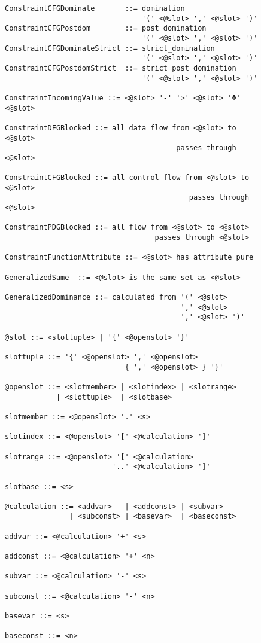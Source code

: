 \begin{figure}[p]
\begin{lstlisting}[language=BNF,basicstyle=\linespread{0.85}\small\ttfamily,
                   firstnumber=101]
ConstraintCFGDominate       ::= domination            
                                '(' <@slot> ',' <@slot> ')'
ConstraintCFGPostdom        ::= post_domination
                                '(' <@slot> ',' <@slot> ')'
ConstraintCFGDominateStrict ::= strict_domination
                                '(' <@slot> ',' <@slot> ')'
ConstraintCFGPostdomStrict  ::= strict_post_domination
                                '(' <@slot> ',' <@slot> ')'

ConstraintIncomingValue ::= <@slot> '-' '>' <@slot> 'Φ' <@slot>

ConstraintDFGBlocked ::= all data flow from <@slot> to <@slot>
                                        passes through <@slot>

ConstraintCFGBlocked ::= all control flow from <@slot> to <@slot>
                                           passes through <@slot>

ConstraintPDGBlocked ::= all flow from <@slot> to <@slot>
                                   passes through <@slot>

ConstraintFunctionAttribute ::= <@slot> has attribute pure

GeneralizedSame  ::= <@slot> is the same set as <@slot>

GeneralizedDominance ::= calculated_from '(' <@slot>
                                         ',' <@slot>
                                         ',' <@slot> ')'

@slot ::= <slottuple> | '{' <@openslot> '}'

slottuple ::= '{' <@openslot> ',' <@openslot>
                            { ',' <@openslot> } '}'

@openslot ::= <slotmember> | <slotindex> | <slotrange>
            | <slottuple>  | <slotbase>

slotmember ::= <@openslot> '.' <s>

slotindex ::= <@openslot> '[' <@calculation> ']'

slotrange ::= <@openslot> '[' <@calculation>
                         '..' <@calculation> ']'

slotbase ::= <s>

@calculation ::= <addvar>   | <addconst> | <subvar>
               | <subconst> | <basevar>  | <baseconst>

addvar ::= <@calculation> '+' <s>

addconst ::= <@calculation> '+' <n>

subvar ::= <@calculation> '-' <s>

subconst ::= <@calculation> '-' <n>

basevar ::= <s>

baseconst ::= <n>
\end{lstlisting}
\end{figure}